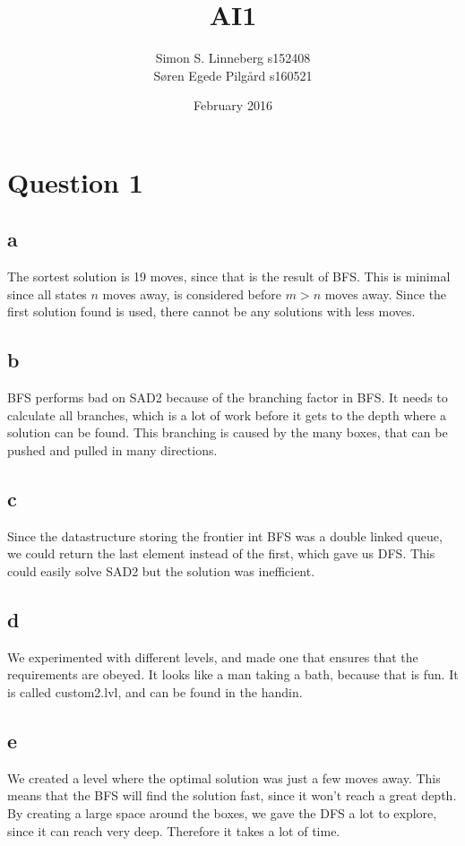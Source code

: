 \documentclass{article}
\title{AI1}
\author{Simon S. Linneberg s152408 \\ Søren Egede Pilgård s160521}
\date{February 2016}
\begin{document}
\maketitle

\section{Question 1}
\subsection{ a }
The sortest solution is 19 moves, since that is the result of BFS. This is minimal since
all states $n$ moves away, is considered before $m > n$ moves away. Since the first
solution found is used, there cannot be any solutions with less moves.

\subsection{ b }
BFS performs bad on SAD2 because of the branching factor in BFS. It needs to calculate
all branches, which is a lot of work before it gets to the depth where a solution can be found.
This branching is caused by the many boxes, that can be pushed and pulled in many directions.\\

\subsection{c}
Since the datastructure storing the frontier int BFS was a double linked queue, we could
return the last element instead of the first, which gave us DFS. This could easily solve
SAD2 but the solution was inefficient.\\

\subsection{d}
We experimented with different levels, and made one that ensures that the requirements are obeyed.
It looks like a man taking a bath, because that is fun. It is called custom2.lvl, and can be found
in the handin.

\subsection{e}
We created a level where the optimal solution was just a few moves away. This means that the BFS will
find the solution fast, since it won't reach a great depth. By creating a large space around the boxes,
we gave the DFS a lot to explore, since it can reach very deep. Therefore it takes a lot of time.\\
\end{document}
